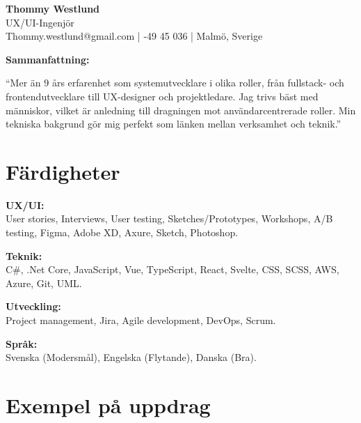 \documentclass[a4paper,10pt]{article}
\begin{document}
\begin{center}
    \huge \textbf{Thommy Westlund}\\
    \vspace{0.2cm}
    \Large UX/UI-Ingenjör\\
    \vspace{0.3cm}
    \normalsize Thommy.westlund@gmail.com \quad | -49 45 036 \quad | \quad Malmö, Sverige
\end{center}

\vspace{0.5cm}

\noindent \textbf{Sammanfattning:}
\vspace{0.2cm}

\noindent
“Mer än 9 års erfarenhet som systemutvecklare i olika roller, från fullstack- och frontendutvecklare till UX-designer och projektledare. Jag trivs bäst med människor, vilket är anledning till dragningen mot användarcentrerade roller. Min tekniska bakgrund gör mig perfekt som länken mellan verksamhet och teknik.”
\vspace{0.3cm}

\section*{Färdigheter}

\textbf{UX/UI:}\\
User stories, Interviews, User testing, Sketches/Prototypes, Workshops, A/B testing, Figma, Adobe XD, Axure, Sketch, Photoshop.

\vspace{0.3cm}

\textbf{Teknik:}\\
C\#, .Net Core, JavaScript, Vue, TypeScript, React, Svelte, CSS, SCSS, AWS, Azure, Git, UML.

\vspace{0.3cm}

\textbf{Utveckling:}\\
Project management, Jira, Agile development, DevOps, Scrum.

\vspace{0.3cm}

\textbf{Språk:}\\
Svenska (Modersmål), Engelska (Flytande), Danska (Bra).

\vspace{0.5cm}

\section*{Exempel på uppdrag}
\end{document}
